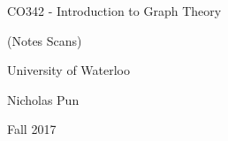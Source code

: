 \documentclass[12pt]{article}
\begin{document}
\begin{titlepage}
  \centering
  \vspace*{2in}
  {\huge CO342 - Introduction to Graph Theory}\par
  {\Large (Notes Scans)}\par
  \vspace{0.3in}
  {\large University of Waterloo}\par
  {\large Nicholas Pun}\par
  {\large Fall 2017}\par 
\end{titlepage}
 
\tableofcontents
\clearpage



\clearpage



\clearpage



\clearpage



\clearpage
\end{document}
